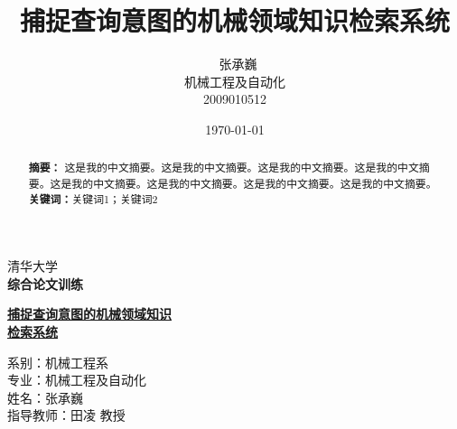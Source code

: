 \documentclass[12pt,a4paper]{article}
\title{\yihao\textbf{捕捉查询意图的机械领域知识检索系统}}
\author{\xiaosihao\ 张承巍\\机械工程及自动化\\2009010512}
\date{\today}
\newcommand{\xiaochu}{\fontsize{36pt}{\baselineskip}\selectfont}
\newcommand{\yihao}{\fontsize{26pt}{\baselineskip}\selectfont}
\newcommand{\sanhao}{\fontsize{16pt}{\baselineskip}\selectfont}
\newcommand{\xiaosanhao}{\fontsize{15pt}{\baselineskip}\selectfont}
\renewcommand{\today}{\number\year 年\number\month 月\number\day 日}
\begin{document}
\begin{titlepage}
\begin{center}



{\yihao \lishu 清华大学}\\[1.5cm]

\textbf{\xiaochu \bfseries {综合论文训练} }\\[1.5cm]

\end{center}
\textbf{\xiaosanhao{题目：}\yihao \underline{捕捉查询意图的机械领域知识}\\ \hspace*{14mm} \underline{检索系统}}\\[4cm]



\FangSong \sanhao 
{

\hspace{11mm}系\hspace{11mm}别：机械工程系\\[0.25cm]

\hspace{11mm}专\hspace{11mm}业：机械工程及自动化\\[0.25cm]

\hspace{11mm}姓\hspace{11mm}名：张承巍\\[0.25cm]

\hspace{11mm}指导教师：田凌 教授\\[3cm]

}



\center{ \large \today}





\end{titlepage}



\renewcommand\abstractname{中文摘要}
\begin{abstract}
\noindent \textbf{摘\qquad \quad 要：} 这是我的中文摘要。这是我的中文摘要。这是我的中文摘要。这是我的中文摘要。这是我的中文摘要。这是我的中文摘要。这是我的中文摘要。这是我的中文摘要。\\
\textbf{关\quad 键\quad 词：}关键词1；关键词2
\end{abstract}
\end{document}
